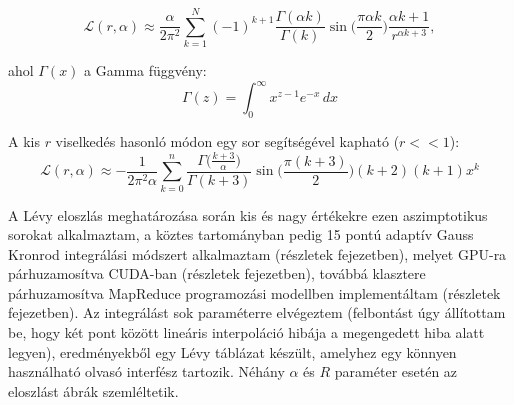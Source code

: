 \documentclass[10pt,a4paper]{article}
\numberwithin{equation}{subsection}
\numberwithin{figure}{section}
\begin{document}
\begin{equation}
\mathcal{L}(r,\alpha) \approx \frac{\alpha}{2\pi^2}\sum_{k=1}^{N}(-1)^{k+1}\frac{\Gamma(\alpha k)}{\Gamma(k)} \sin{\bigg(\frac{\pi\alpha k}{2}\bigg)}\frac{\alpha k+1}{r^{\alpha k+3}},
\end{equation}

ahol $\Gamma(x)$ a Gamma függvény:
\begin{equation}
 \Gamma (z)=\int _{0}^{\infty }x^{z-1}e^{-x}\,dx
 \label{eq:gamma}
\end{equation}

A kis $r$ viselkedés hasonló módon egy sor segítségével kapható ($r<<1$):
\begin{equation}
\mathcal{L}(r,\alpha) \approx -\frac{1}{2\pi^2\alpha}\sum_{k=0}^n\frac{\Gamma\big(\frac{k+3}{\alpha}\big)}{\Gamma(k+3)}\sin{\bigg(\frac{\pi(k+3)}{2}\bigg)}(k+2)(k+1)x^k
\end{equation} 

A Lévy eloszlás meghatározása során kis és nagy értékekre ezen aszimptotikus sorokat alkalmaztam, a köztes tartományban pedig 15 pontú adaptív Gauss Kronrod integrálási módszert alkalmaztam (részletek  fejezetben), melyet GPU-ra párhuzamosítva CUDA-ban (részletek  fejezetben), továbbá klasztere párhuzamosítva MapReduce programozási modellben implementáltam (részletek  fejezetben). Az integrálást sok paraméterre elvégeztem (felbontást úgy állítottam be, hogy két pont között lineáris interpoláció hibája a megengedett hiba alatt legyen), eredményekből egy Lévy táblázat készült, amelyhez egy könnyen használható olvasó interfész tartozik. Néhány $\alpha$ és $R$ paraméter esetén az eloszlást  ábrák szemléltetik.
\end{document}
